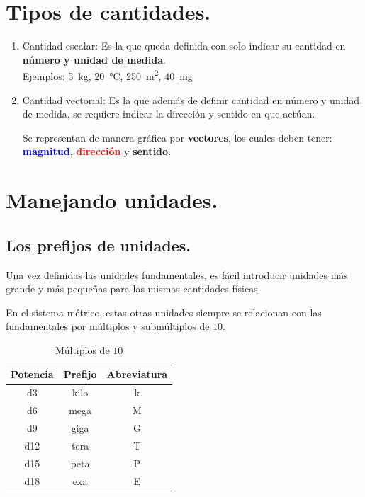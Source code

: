 \documentclass[14pt]{extarticle}
\newcommand{\textocolor}[2]{\textbf{\textcolor{#1}{#2}}}
\begin{document}
\section{Tipos de cantidades.}

\begin{enumerate}
\item Cantidad escalar: Es la que queda definida con solo indicar su cantidad en \textocolor{amethyst}{número y unidad de medida}.
\\
Ejemplos: \SI{5}{\kilo\gram},  \SI{20}{\degreeCelsius},  \SI{250}{\square\meter},  \SI{40}{\milli\gram}
\item Cantidad vectorial: Es la que además de definir cantidad en número y unidad de medida, se requiere indicar la dirección y sentido en que actúan.

Se representan de manera gráfica por \textocolor{ao(english)}{vectores},  los cuales deben tener: \textocolor{blue}{magnitud},  \textocolor{red}{dirección}  y \textocolor{cadmiumorange}{sentido}.
\end{enumerate}

\section{Manejando unidades.}

\subsection{Los prefijos de unidades.}

Una vez definidas las unidades fundamentales, es fácil introducir unidades más grande y más pequeñas para las mismas cantidades físicas.

En el sistema métrico, estas otras unidades siempre se relacionan con las fundamentales por múltiplos y submúltiplos de $10$.

\begin{table}[H]
\renewcommand{\arraystretch}{1}
\centering
\begin{tabular}{c | c | c}
Potencia & Prefijo & Abreviatura \\ \hline
\num{d3} & kilo & k \\ \hline
\num{d6} & mega & M \\ \hline
\num{d9} & giga & G \\ \hline
\num{d12} & tera & T \\ \hline
\num{d15} & peta & P \\ \hline
\num{d18} & exa & E \\ \hline
\end{tabular}
\caption{Múltiplos de $10$}
\end{table}
\end{document}
